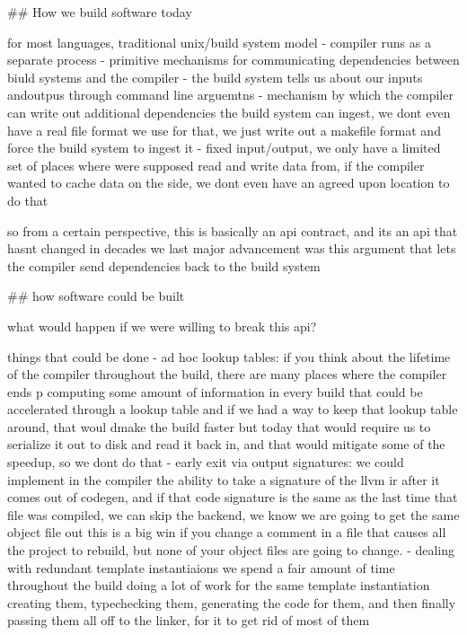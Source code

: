 \documentclass[12pt, a4paper]{report}
\begin{document}
## How we build software today

  for most languages, traditional unix/build system model
  - compiler runs as a separate process
  - primitive mechanisms for communicating dependencies between biuld systems and the compiler
    - the build system tells us about our inputs andoutpus through command line arguemtns
    - mechanism by which the compiler can write out additional dependencies the build system can ingest, we dont even have a real file format we use for that, we just write out a makefile format and force the build system to ingest it
    - fixed input/output, we only have a limited set of places where were supposed read and write data from, if the compiler wanted to cache data on the side, we dont even have an agreed upon location to do that

  so from a certain perspective, this is basically an api contract, and its an api that hasnt changed in decades
  we last major advancement was this argument that lets the compiler send dependencies back to the build system

## how software could be built

  what would happen if we were willing to break this api?

  things that could be done
  - ad hoc lookup tables:
    if you think about the lifetime of the compiler throughout the build, there are many places where the compiler ends
  p computing some amount of information in every build that could be accelerated through a lookup table
    and if we had a way to keep that lookup table around, that woul dmake the build faster
    but today that would require us to serialize it out to disk and read it back in, and that would mitigate some of the speedup, so we dont do that
  - early exit via output signatures:
    we could implement in the compiler the ability to take a signature of the llvm ir after it comes out of codegen, and if that code signature is the same as the last time that file was compiled, we can skip the backend, we know we are going to get the same object file out
    this is a big win if you change a comment in a file that causes all the project to rebuild, but none of your object files are going to change.
  - dealing with redundant template instantiaions
    we spend a fair amount of time throughout the build doing a lot of work for the same template instantiation
    creating them, typechecking them, generating the code for them, and then finally passing them all off to the linker, for it to get rid of most of them
\end{document}
